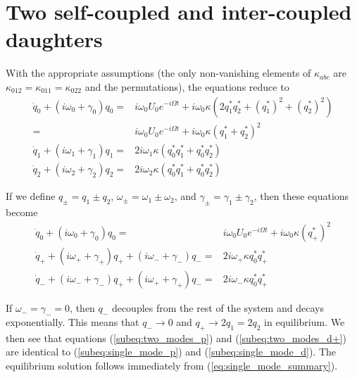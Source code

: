 \section*{Two self-coupled and inter-coupled daughters}

With the appropriate assumptions (the only non-vanishing elements of $\kappa_{abc}$ are $\kappa_{012}=\kappa_{011}=\kappa_{022}$ and the permutations), the equations reduce to
\begin{subequations}
\begin{align}
\dot{q}_0 + (i\omega_0 + \gamma_0) q_0 = & i\omega_0 U_0 e^{-i\Omega t} + i\omega_0 \kappa \left( 2 q_1^\ast q_2^\ast + (q_1^\ast)^2 + (q_2^\ast)^2 \right) \\
                                       = & i\omega_0 U_0 e^{-i\Omega t} + i\omega_0 \kappa \left(q_1^\ast + q_2^\ast\right)^2 \\
\dot{q}_1 + (i\omega_1 + \gamma_1) q_1 = & 2i\omega_1 \kappa \left( q_0^\ast q_1^\ast + q_0^\ast q_2^\ast \right) \\
\dot{q}_2 + (i\omega_2 + \gamma_2) q_2 = & 2i\omega_2 \kappa \left( q_0^\ast q_1^\ast + q_0^\ast q_2^\ast \right)
\end{align}
\end{subequations}

If we define $q_{\pm} = q_1 \pm q_2$, $\omega_{\pm} = \omega_1 \pm \omega_2$, and $\gamma_{\pm} = \gamma_1 \pm \gamma_2$, then these equations become
\begin{subequations}
\begin{align}
\dot{q}_0 +(i\omega_0 + \gamma_0) q_0 = & i\omega_0 U_0 e^{-i\Omega t} + i\omega_0 \kappa (q_{+}^\ast)^2 \label{subeq:two_modes_p} \\
\dot{q}_{+} + (i\omega_{+} + \gamma_{+}) q_{+} + (i\omega_{-} + \gamma_{-}) q_{-} = & 2i\omega_{+}\kappa q_0^\ast q_{+}^\ast \label{subeq:two_modes_d+} \\
\dot{q}_{-} + (i\omega_{-} + \gamma_{-}) q_{+} + (i\omega_{+} + \gamma_{+}) q_{-} = & 2i\omega_{-}\kappa q_0^\ast q_{+}^\ast \label{subeq:two_modes_d-}
\end{align}
\end{subequations}

If $\omega_{-} = \gamma_{-} = 0$, then $q_{-}$ decouples from the rest of the system and decays exponentially. This means that $q_{-} \rightarrow 0$ and $q_{+} \rightarrow 2 q_1 = 2 q_2$ in equilibrium. We then see that equations (\ref{subeq:two_modes_p}) and (\ref{subeq:two_modes_d+}) are identical to (\ref{subeq:single_mode_p}) and (\ref{subeq:single_mode_d}). The equilibrium solution follows immediately from (\ref{eq:single_mode_summary}).

